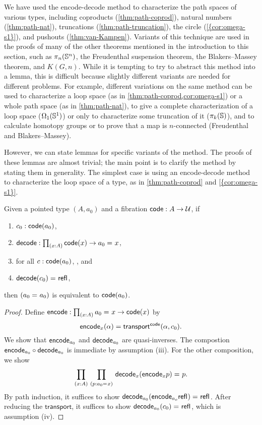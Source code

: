 We have used the encode-decode method to characterize the path spaces
of various types, including coproducts (\cref{thm:path-coprod}), natural
numbers (\cref{thm:path-nat}), truncations (\cref{thm:path-truncation}),
the circle (\cref{{cor:omega-s1}}), and pushouts
(\cref{thm:van-Kampen}).  Variants of this technique are used in the
proofs of many of the other theorems mentioned in the introduction to
this section, such as $\pi_n(\mathbb{S}^n)$, the Freudenthal suspension
theorem, the Blakers--Massey theorem, and $K(G,n)$.  While it is tempting to try to
abstract this method into a lemma, this is difficult because
slightly different variants are needed for different problems.  For
example, different variations on the same method  can be used to
characterize a loop space (as in \cref{thm:path-coprod,cor:omega-s1}) or
a whole path space (as in \cref{thm:path-nat}), to give a complete
characterization of a loop space ($\Omega_1(\mathbb{S} ^1)$) or only to
characterize some truncation of it ($\pi_k(\mathbb{S})$), and to calculate
homotopy groups or to prove that a map is $n$-connected (Freudenthal and
Blakers--Massey).

However, we can state lemmas for specific variants of the method.
The proofs of these lemmas are almost trivial; the main point is to
clarify the method by stating them in generality.  The simplest
case is using an encode-decode method to characterize the loop space of a
type, as in \cref{thm:path-coprod} and \cref{{cor:omega-s1}}.

\begin{lem}
Given a pointed type $(A,a_0)$ and a fibration
$\mathsf{code} : A \to \mathcal{U}$, if 
\begin{enumerate}
\item $c_0 : \mathsf{code}(a_0)$,
\item $\decode : \prd{x:A} \code(x) \to \id{a_0}{x}$,
\item for all $c : \mathsf{code}(a_0)$, , and
\item $\mathsf{decode}(c_0) =_{} \mathsf{refl}_{}$,
\end{enumerate}
then $(a_0 =_{} a_0)$ is equivalent to $\mathsf{code}(a_0)$.
\end{lem}

\begin{proof}
Define
$\encode : \prd{x:A} \id{a_0}{x} \to \code(x)$ by
\[
\mathsf{encode}_x(\alpha) = \mathsf{transport}^{\mathsf{code}}(\alpha,c_0).
\]
We show that $\mathsf{encode}_{a_0}$ and $\mathsf{decode}_{a_0}$ are quasi-inverses.  
The compostion $\mathsf{encode}_{a_0} \circ \mathsf{decode}_{a_0}$ is immediate by
assumption (iii).  For the other composition, we show
\[
\prd{x:A}{p : \id{a_0}{x}} \id{\decode_{x} (\encode_{x} p)}{p}.
\] 
By path induction, it suffices to show 
${\mathsf{decode}_{{a_0}} (\mathsf{encode}_{{a_o}} \mathsf{refl}_{})} =_{} \mathsf{refl}_{}$.
After reducing the $\mathsf{transport}$, it suffices to show 
${\mathsf{decode}_{{a_0}} (c_0)} =_{} \mathsf{refl}_{}$, which is assumption (iv).  
\end{proof}

